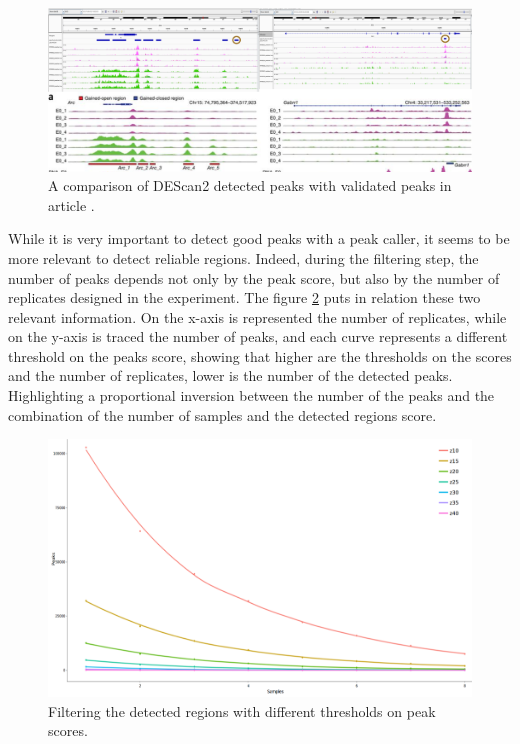 \begin{figure}[H]
\includegraphics[width=\textwidth,height=\textheight,keepaspectratio]{img/descan2/peaks.png}
\caption[DEScan2 peaks detection]{A comparison of DEScan2 detected peaks with validated peaks in article \cite{Su2017}.}
\label{fig:peaksdescan}
\centering
\end{figure}

While it is very important to detect good peaks with a peak caller, it seems to be more relevant to detect reliable regions. Indeed, during the filtering step, the number of peaks depends not only by the peak score, but also by the number of replicates designed in the experiment.
The figure \ref{fig:filteringdescan} puts in relation these two relevant information. 
On the x-axis is represented the number of replicates, while on the y-axis is traced the number of peaks, and each curve represents a different threshold on the peaks score, showing that higher are the thresholds on the scores and the number of replicates, lower is the number of the detected peaks.
Highlighting a proportional inversion between the number of the peaks and the combination of the number of samples and the detected regions score.


\begin{figure}[H]
\includegraphics[width=\textwidth, height=\textheight, keepaspectratio]{img/descan2/filtering.png}
\caption[DEScan2 filtering step]{Filtering the detected regions with different thresholds on peak scores.}
\label{fig:filteringdescan}
\centering
\end{figure}

